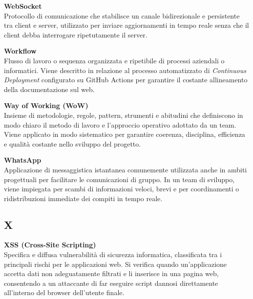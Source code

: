 \documentclass[12pt, a4paper]{article}
\begin{document}
\noindent\hypertarget{websocket}{\textbf{WebSocket}} \\[0.1em]
Protocollo di comunicazione che stabilisce un canale bidirezionale e persistente tra client e server, utilizzato per inviare aggiornamenti in tempo reale senza che il client debba interrogare ripetutamente il server.
\vspace{0.5cm}

\noindent\hypertarget{workflow}{\textbf{Workflow}} \\[0.1em]
Flusso di lavoro o sequenza organizzata e ripetibile di processi aziendali o informatici. Viene descritto in relazione al processo automatizzato di \textit{Continuous Deployment} configurato su GitHub Actions per garantire il costante allineamento della documentazione sul web.
\vspace{0.5cm}  

\noindent\hypertarget{wow}{\textbf{Way of Working (WoW)}} \\[0.1em]
Insieme di metodologie, regole, pattern, strumenti e abitudini che definiscono in modo chiaro il metodo di lavoro e l'approccio operativo adottato da un team. Viene applicato in modo sistematico per garantire coerenza, disciplina, efficienza e qualità costante nello sviluppo del progetto.
\vspace{0.5cm}

\noindent\hypertarget{whatsapp}{\textbf{WhatsApp}} \\[0.1em]
Applicazione di messaggistica istantanea comunemente utilizzata anche in ambiti progettuali per facilitare le comunicazioni di gruppo. In un team di sviluppo, viene impiegata per scambi di informazioni veloci, brevi e per coordinamenti o ridistribuzioni immediate dei compiti in tempo reale.
\vspace{0.1cm}
\newpage

\subsection*{X}
{}
\vspace{0.2cm}

\noindent\hypertarget{xss}{\textbf{XSS (Cross-Site Scripting)}} \\[0.1em]
Specifica e diffusa vulnerabilità di sicurezza informatica, classificata tra i principali rischi per le applicazioni web. Si verifica quando un'applicazione accetta dati non adeguatamente filtrati e li inserisce in una pagina web, consentendo a un attaccante di far eseguire script dannosi direttamente all'interno del browser dell'utente finale.
\vspace{0.1cm}
\end{document}
